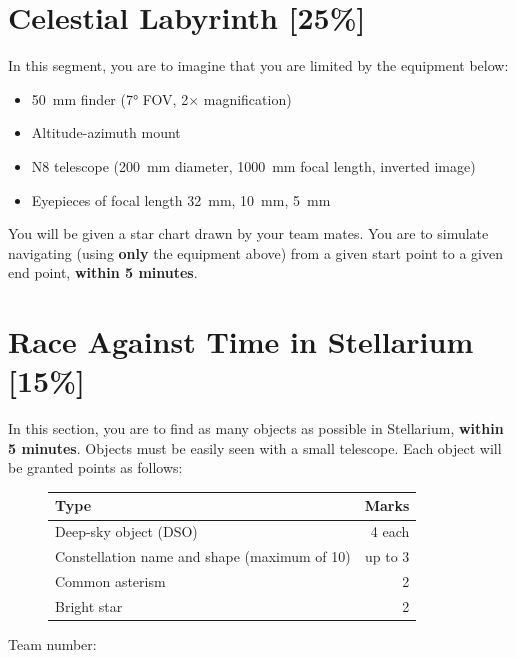 \documentclass[a4paper,11pt]{exam}
\begin{document}
\newpage
\section{Celestial Labyrinth \hfill [25\%]}
In this segment, you are to imagine that you are limited by the equipment below:
\begin{itemize}[leftmargin=10pt]
	\item \SI{50}{\milli\metre} finder (\ang{7} FOV, 2$ \times $ magnification)
	\item Altitude-azimuth mount
	\item N8 telescope (\SI{200}{\milli\metre} diameter, \SI{1000}{\milli\metre} focal length, inverted image)
	\item Eyepieces of focal length \SI{32}{\milli\metre}, \SI{10}{\milli\metre}, \SI{5}{\milli\metre} 
\end{itemize}
You will be given a star chart drawn by your team mates. You are to simulate navigating (using \textbf{only} the equipment above) from a given start point to a given end point, \textbf{within 5 minutes}. 

\section{Race Against Time in Stellarium \hfill [15\%]}
In this section, you are to find as many objects as possible in Stellarium, \textbf{within 5 minutes}. Objects must be easily seen with a small telescope. Each object will be granted points as follows:
\begin{figure}[H]
	\centering
	\begin{tabularx}{0.7\linewidth}{@{}Xr@{}}
		\toprule
		\textbf{Type} & \textbf{Marks} \\ \midrule
		Deep-sky object (DSO) & 4 each \\
		Constellation name and shape (maximum of 10) &  up to 3 \\
		Common asterism & 2 \\
		Bright star & 2 \\
		\bottomrule
	\end{tabularx}
\end{figure}

\newpage
{}\label{cloze1}
\begin{center}
\end{center}
\vspace*{20pt}
Team number:\enspace\hrulefill
\end{document}

